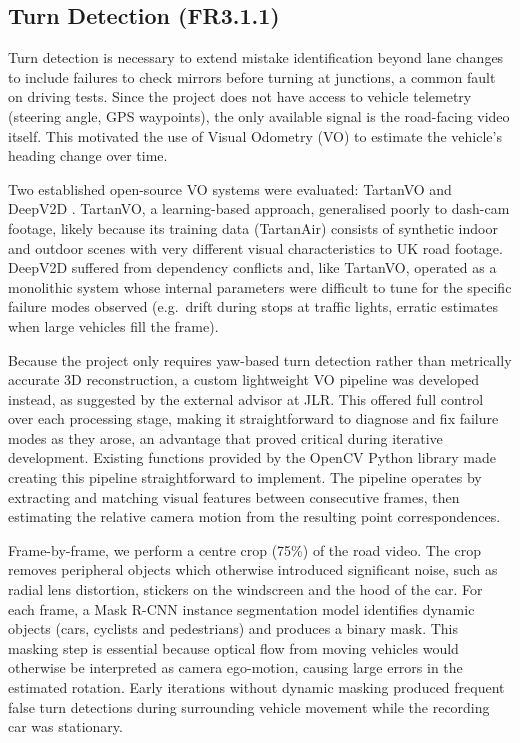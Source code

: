 \documentclass{article}
\begin{document}
\subsection{Turn Detection (FR3.1.1)}
Turn detection is necessary to extend mistake identification beyond lane changes to include failures to check mirrors before turning at junctions, a common fault on driving tests. Since the project does not have access to vehicle telemetry (steering angle, GPS waypoints), the only available signal is the road-facing video itself. This motivated the use of Visual Odometry (VO) to estimate the vehicle's heading change over time.

Two established open-source VO systems were evaluated: TartanVO \cite{wang2021tartanvo} and DeepV2D \cite{teed_deepv2d_2020}. TartanVO, a learning-based approach, generalised poorly to dash-cam footage, likely because its training data (TartanAir) consists of synthetic indoor and outdoor scenes with very different visual characteristics to UK road footage. DeepV2D suffered from dependency conflicts and, like TartanVO, operated as a monolithic system whose internal parameters were difficult to tune for the specific failure modes observed (e.g.\ drift during stops at traffic lights, erratic estimates when large vehicles fill the frame).

Because the project only requires yaw-based turn detection rather than metrically accurate 3D reconstruction, a custom lightweight VO pipeline was developed instead, as suggested by the external advisor at JLR. This offered full control over each processing stage, making it straightforward to diagnose and fix failure modes as they arose, an advantage that proved critical during iterative development. Existing functions provided by the OpenCV Python library made creating this pipeline straightforward to implement. The pipeline operates by extracting and matching visual features between consecutive frames, then estimating the relative camera motion from the resulting point correspondences. 

Frame-by-frame, we perform a centre crop (75\%) of the road video. The crop removes peripheral objects which otherwise introduced significant noise, such as radial lens distortion, stickers on the windscreen and the hood of the car. For each frame, a Mask R-CNN \cite{he2017mask} instance segmentation model identifies dynamic objects (cars, cyclists and pedestrians) and produces a binary mask. This masking step is essential because optical flow from moving vehicles would otherwise be interpreted as camera ego-motion, causing large errors in the estimated rotation. Early iterations without dynamic masking produced frequent false turn detections during surrounding vehicle movement while the recording car was stationary.
\end{document}
